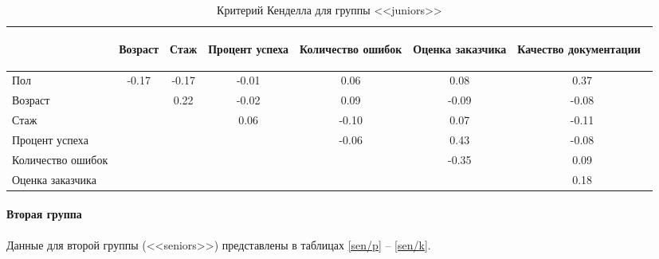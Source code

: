 \begin{table}[H]
	\centering
	\caption{Критерий Кенделла для группы <<juniors>>}
	\begin{tabular}{|l|c|c|c|c|c|c|}
		\hline
		&  
		\begin{sideways}
			Возраст
		\end{sideways}  & 
		\begin{sideways}
			Стаж
		\end{sideways} & 
		\begin{sideways}
			Процент успеха
		\end{sideways} & 
		\begin{sideways}
			Количество ошибок
		\end{sideways} &
		\begin{sideways}
			Оценка заказчика
		\end{sideways} & 
		\begin{sideways}
			Качество документации~
		\end{sideways} \\ \hline
		Пол                   & -0.17 & -0.17 & -0.01 & 0.06 & 0.08 & 0.37 \\\hline
		Возраст               &&  0.22 & -0.02 &  0.09 & -0.09 & -0.08 \\ \hline
		Стаж                  &&&  0.06 & -0.10 &  0.07 & -0.11 \\ \hline
		Процент успеха        &&&& -0.06 &  0.43 & -0.08 \\ \hline	
		Количество ошибок     &&&&& -0.35 &  0.09 \\ \hline	
		Оценка заказчика      &&&&&&  0.18 \\ \hline	
	\end{tabular}
	\label{jun/k}
\end{table}




\paragraph{Вторая группа}
Данные для второй группы (<<seniors>>) представлены в таблицах \ref{sen/p} -- \ref{sen/k}.

